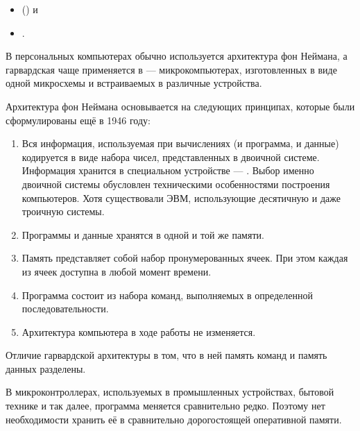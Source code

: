 \begin{itemize}
\item {}
  () и
\item {}.
\end{itemize}

В персональных компьютерах обычно используется архитектура фон
Неймана, а гарвардская чаще применяется в
 — микрокомпьютерах,
изготовленных в виде одной микросхемы и встраиваемых в различные
устройства.


Архитектура фон Неймана основывается на следующих принципах, которые
были сформулированы ещё в 1946 году:

\begin{enumerate}
\item {} Вся информация, используемая при вычислениях (и
  программа, и данные) кодируется в виде набора чисел, представленных
  в двоичной системе. Информация хранится в специальном устройстве —
  . Выбор именно двоичной системы обусловлен
  техническими особенностями построения компьютеров. Хотя существовали
  ЭВМ, использующие десятичную и даже троичную системы.
\item {}
  Программы и данные хранятся в одной и той же памяти.
\item {}
  Память представляет собой набор пронумерованных ячеек. При этом
  каждая из ячеек доступна в любой момент времени.
\item {} Программа состоит из набора команд, выполняемых в
  определенной последовательности.
\item {} Архитектура компьютера в ходе работы не изменяется.
\end{enumerate}


Отличие гарвардской архитектуры в том, что в ней память команд и
память данных разделены.

В микроконтроллерах, используемых в промышленных устройствах, бытовой
технике и так далее, программа меняется сравнительно редко. Поэтому
нет необходимости хранить её в сравнительно дорогостоящей оперативной
памяти.

